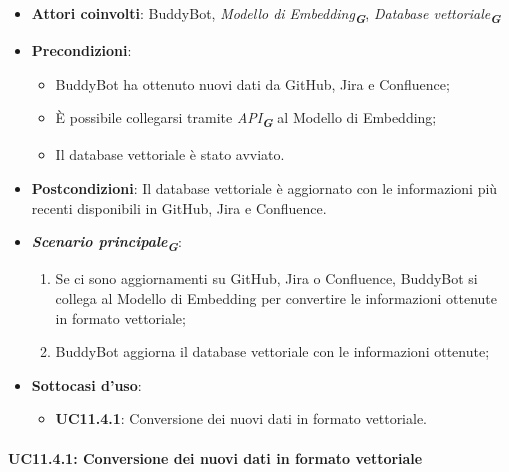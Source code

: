 \begin{itemize}
    \item \textbf{Attori coinvolti}: BuddyBot, \emph{Modello di Embedding}\textsubscript{\textbf{\textit{G}}}, 
    \emph{Database vettoriale}\textsubscript{\textbf{\textit{G}}}
    \item \textbf{Precondizioni}: 
    \begin{itemize}
        \item BuddyBot ha ottenuto nuovi dati da GitHub, Jira e Confluence;
        \item È possibile collegarsi tramite \emph{API}\textsubscript{\textbf{\textit{G}}} al Modello di Embedding;
        \item Il database vettoriale è stato avviato.
    \end{itemize}
    \item \textbf{Postcondizioni}: Il database vettoriale è aggiornato con le informazioni più recenti disponibili in GitHub, Jira e Confluence.
    \item \textbf{\emph{Scenario principale}\textsubscript{\textbf{\textit{G}}}}:
    \begin{enumerate}
        \item Se ci sono aggiornamenti su GitHub, Jira o Confluence, BuddyBot si collega al Modello di Embedding per convertire le informazioni 
        ottenute in formato vettoriale;
        \item BuddyBot aggiorna il database vettoriale con le informazioni ottenute;
    \end{enumerate}
    \item \textbf{Sottocasi d'uso}:
    \begin{itemize}
        \item \textbf{UC11.4.1}: Conversione dei nuovi dati in formato vettoriale.
    \end{itemize}
\end{itemize}



\paragraph{UC11.4.1: Conversione dei nuovi dati in formato vettoriale}

